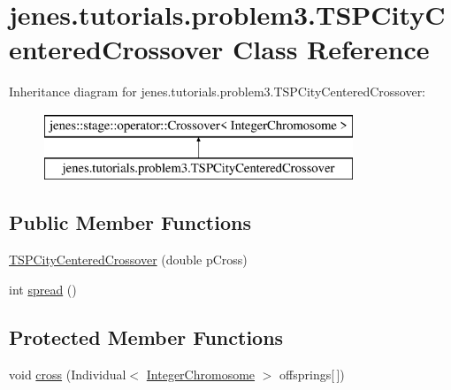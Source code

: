 \hypertarget{classjenes_1_1tutorials_1_1problem3_1_1_t_s_p_city_centered_crossover}{\section{jenes.\-tutorials.\-problem3.\-T\-S\-P\-City\-Centered\-Crossover Class Reference}
\label{classjenes_1_1tutorials_1_1problem3_1_1_t_s_p_city_centered_crossover}
}
Inheritance diagram for jenes.\-tutorials.\-problem3.\-T\-S\-P\-City\-Centered\-Crossover\-:\begin{figure}[H]
\begin{center}
\leavevmode
\includegraphics[height=2.000000cm]{classjenes_1_1tutorials_1_1problem3_1_1_t_s_p_city_centered_crossover}
\end{center}
\end{figure}
\subsection*{Public Member Functions}
\begin{DoxyCompactItemize}
\item 
\hyperlink{classjenes_1_1tutorials_1_1problem3_1_1_t_s_p_city_centered_crossover_a1609c37822bff6e6af8cb82082d8cd9d}{T\-S\-P\-City\-Centered\-Crossover} (double p\-Cross)
\item 
int \hyperlink{classjenes_1_1tutorials_1_1problem3_1_1_t_s_p_city_centered_crossover_a3a5e0f99396f1fb6dc89981969d58c13}{spread} ()
\end{DoxyCompactItemize}
\subsection*{Protected Member Functions}
\begin{DoxyCompactItemize}
\item 
void \hyperlink{classjenes_1_1tutorials_1_1problem3_1_1_t_s_p_city_centered_crossover_aeb7cb2d42aeeea2cb008f98d63b64805}{cross} (Individual$<$ \hyperlink{classjenes_1_1chromosome_1_1_integer_chromosome}{Integer\-Chromosome} $>$ offsprings\mbox{[}$\,$\mbox{]})
\end{DoxyCompactItemize}
